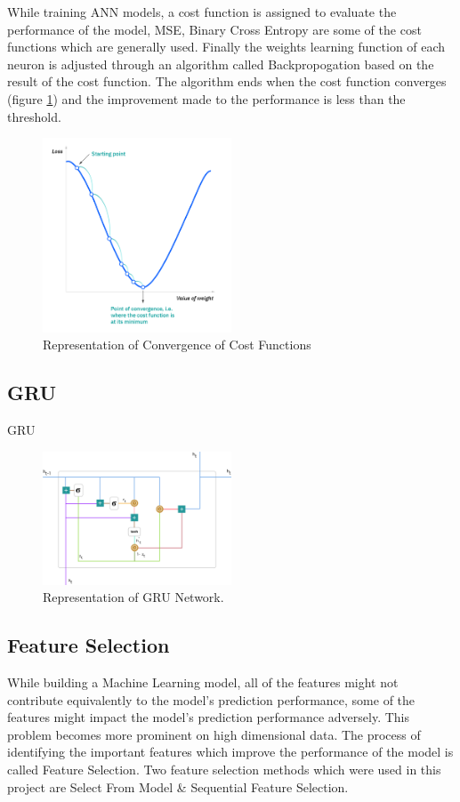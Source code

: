 \documentclass[twoside,11pt,a4paper]{article}
\begin{document}
While training \acs{ANN} models, a cost function is assigned to evaluate the performance of the model, \acf{MSE}, Binary Cross Entropy are some of the cost functions which are generally used. Finally the weights learning function of each neuron is adjusted through an algorithm called Backpropogation based on the result of the cost function. The algorithm ends when the cost function converges (figure \ref{fig:cost_function}) and the improvement made to the performance is less than the threshold.
\begin{figure}[ht]
	\centering
	\includegraphics[width=0.5\textwidth]{cost_function}
	\caption[Representation of Convergence of Cost Functions]{Representation of Convergence of Cost Functions\citep{ibm2022neural}}
	\label{fig:cost_function}
\end{figure}
\subsection{\acf{GRU}}
\acs{GRU}\citep{cho2014learning}

\begin{figure}[ht]
	\centering
	\includegraphics[width=0.5\textwidth]{gru}
	\caption[Representation of \acf{GRU} Network]{Representation of \acf{GRU} Network\citep{zhao2019evaluation}.}
	\label{fig:gru}
\end{figure}
\subsection{Feature Selection}
While building a Machine Learning model, all of the features might not contribute equivalently to the model's prediction performance, some of the features might impact the model's prediction performance adversely. This problem becomes more prominent on high dimensional data. The process of identifying the important features which improve the performance of the model is called Feature Selection. Two feature selection methods which were used in this project are Select From Model \& Sequential Feature Selection.
\end{document}
